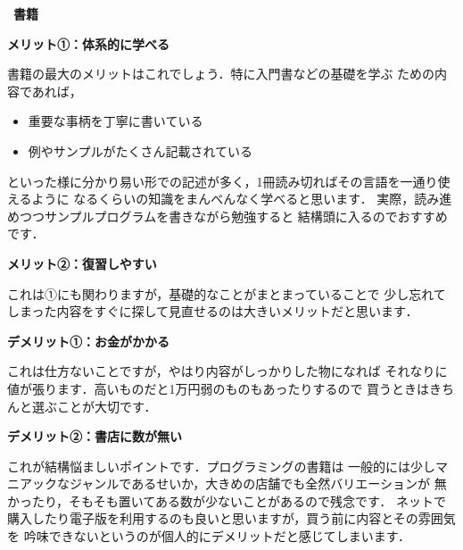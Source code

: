 \documentclass[autodetect-engine,dvi=dvipdfmx,ja=standard,a4j,12pt]{bxjsarticle}
\begin{document}
\begin{itembox}[c]{\huge \ \textbf{書籍}\ }
\begin{center}
    {\large \textbf{メリット①：体系的に学べる}}
\end{center}

書籍の最大のメリットはこれでしょう．特に入門書などの基礎を学ぶ
ための内容であれば，
\begin{itemize}
    \item 重要な事柄を丁寧に書いている
    \item 例やサンプルがたくさん記載されている
\end{itemize}
といった様に分かり易い形での記述が多く，1冊読み切ればその言語を一通り使えるように
なるくらいの知識をまんべんなく学べると思います．
実際，読み進めつつサンプルプログラムを書きながら勉強すると
結構頭に入るのでおすすめです．

\begin{center}
{\large \textbf{メリット②：復習しやすい}}
\end{center}
これは①にも関わりますが，基礎的なことがまとまっていることで
少し忘れてしまった内容をすぐに探して見直せるのは大きいメリットだと思います．

\begin{center}
    {\large \textbf{デメリット①：お金がかかる}}
\end{center}
これは仕方ないことですが，やはり内容がしっかりした物になれば
それなりに値が張ります．高いものだと1万円弱のものもあったりするので
買うときはきちんと選ぶことが大切です．

\begin{center}
    {\large \textbf{デメリット②：書店に数が無い}}
\end{center}
これが結構悩ましいポイントです．プログラミングの書籍は
一般的には少しマニアックなジャンルであるせいか，大きめの店舗でも全然バリエーションが
無かったり，そもそも置いてある数が少ないことがあるので残念です．
ネットで購入したり電子版を利用するのも良いと思いますが，買う前に内容とその雰囲気を
吟味できないというのが個人的にデメリットだと感じてしまいます．
\end{itembox}
\clearpage
\end{document}
